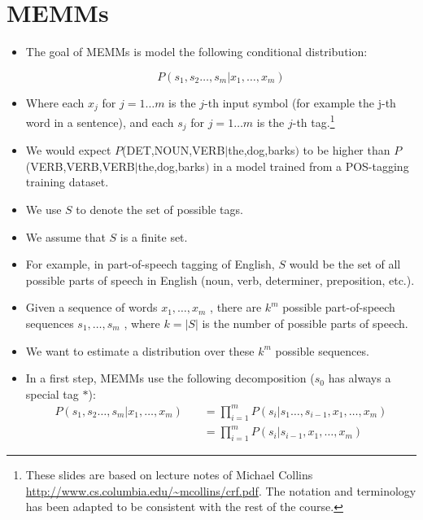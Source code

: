 \section{MEMMs}
\begin{itemize}

 \item The goal of MEMMs is  model the following conditional distribution:
 
 \begin{displaymath}
  P(s_1,s_2 \dots, s_m | x_1, \dots, x_m)
 \end{displaymath}

 \item Where each $x_j$ for $j = 1 \dots m$ is the $j$-th input symbol (for example the j-th word in a sentence), and each $s_j$ for $j = 1 \dots m$ is the $j$-th tag.\footnote{These slides are based on lecture notes of Michael Collins \url{http://www.cs.columbia.edu/~mcollins/crf.pdf}. The notation and terminology has been adapted to be consistent with the rest of the course.}

\item We would expect $P$(DET,NOUN,VERB$|$the,dog,barks$)$ to be higher than $P$(VERB,VERB,VERB$|$the,dog,barks$)$ in a model trained from a POS-tagging training dataset.
 
\item We use $S$ to denote the set of possible tags.
\item We assume that $S$ is a finite set. 
 \item For example, in part-of-speech tagging of English, $S$ would be the set of all possible parts of speech in English (noun, verb, determiner, preposition, etc.).
 \item Given a sequence of words $x_1, \dots, x_m$ , there are $k^m$ possible part-of-speech sequences $s_1, \dots, s_m$ , where $k = |S|$ is the number of possible parts of speech.
 \item We want to estimate a distribution over these $k^m$ possible sequences.

 \item In a first step, MEMMs use the following decomposition ($s_0$ has always a special tag $*$):
 \begin{equation}
\begin{split}
  P(s_1,s_2 \dots, s_m | x_1, \dots, x_m) \quad & =  \prod_{i=1}^{m}    P(s_i | s_1 \dots, s_{i-1}, x_1, \dots, x_m)\\
 \quad & =  \prod_{i=1}^{m}    P(s_i | s_{i-1}, x_1, \dots, x_m)
\end{split}
\end{equation}


\end{itemize}
